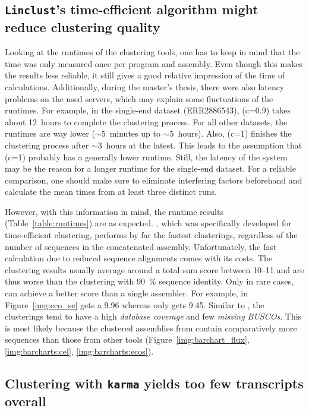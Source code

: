 \documentclass[12pt,a4paper,english]{article}
\begin{document}
	\subsection{\texttt{Linclust}'s time-efficient algorithm might reduce clustering quality}
	    Looking at the runtimes of the clustering tools, one has to keep in mind that the time was only measured once per program and assembly. Even though this makes the results less reliable, it still gives a good relative impression of the time of calculations.
		Additionally, during the master's thesis, there were also latency problems on the used servers, which may explain some fluctuations of the runtimes.
		For example, in the single-end \celegans dataset (ERR2886543), \cdhit (c=0.9) takes about 12~hours to complete the clustering process. For all other datasets, the runtimes are way lower ($\sim$5~minutes up to $\sim$5~hours). Also, \cdhit (c=1) finishes the clustering process after $\sim$3~hours at the latest. This leads to the assumption that \cdhit (c=1) probably has a generally lower runtime. Still, the latency of the system may be the reason for a longer runtime for the single-end \celegans dataset.    
		For a reliable comparison, one should make sure to eliminate interfering factors beforehand and calculate the mean times from at least three distinct runs.
		
		However, with this information in mind, the runtime results (Table~\ref{table:runtimes}) are as expected. \linclust, which was specifically developed for time-efficient clustering, performs by far the fastest clusterings, regardless of the number of sequences in the concatenated assembly.
		Unfortunately, the fast calculation due to reduced sequence alignments comes with its costs.
		The clustering results usually average around a total sum score between 10--11 and are thus worse than the \cdhit clustering with 90~\% sequence identity.
		Only in rare cases, \linclust can achieve a better score than a single assembler. For example, in Figure~\ref{img:eco_se} \linclust gets a 9.96 whereas \spades only gets 9.45. Similar to \cdhit, the clusterings tend to have a high \textit{database coverage} and few \textit{missing BUSCOs}. This is most likely because the clustered assemblies from \linclust contain comparatively more sequences than those from other tools (Figure~\ref{img:barchart_flux}, \ref{img:barcharts:cel}, \ref{img:barcharts:ecos}).
		
	\subsection{Clustering with \texttt{karma} yields too few transcripts overall}
\end{document}

